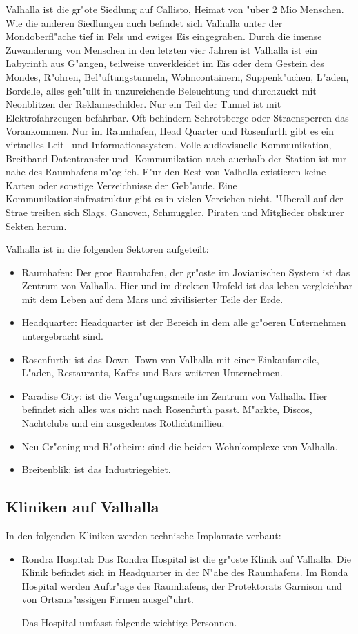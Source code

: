 Valhalla ist die gr"o\3te Siedlung auf Callisto, Heimat von "uber 2 Mio Menschen. Wie die anderen Siedlungen auch befindet sich Valhalla unter der Mondoberfl"ache tief in Fels und ewiges Eis eingegraben. Durch die imense Zuwanderung von Menschen in den letzten vier Jahren ist Valhalla ist ein Labyrinth aus G"angen, teilweise unverkleidet im Eis oder dem Gestein des Mondes, R"ohren, Bel"uftungstunneln, Wohncontainern, Suppenk"uchen, L"aden, Bordelle, alles geh"ullt in unzureichende Beleuchtung und durchzuckt mit Neonblitzen der Reklameschilder. Nur ein Teil der Tunnel ist mit Elektrofahrzeugen befahrbar. Oft behindern Schrottberge oder Stra\3ensperren das Vorankommen. Nur im Raumhafen, Head Quarter und Rosenfurth gibt es ein virtuelles Leit-- und Informationssystem. Volle audiovisuelle Kommunikation, Breitband-Datentransfer und -Kommunikation nach au\3erhalb der Station ist nur nahe des Raumhafens m"oglich. F"ur den Rest von Valhalla existieren keine Karten oder sonstige Verzeichnisse der Geb"aude. Eine Kommunikationsinfrastruktur gibt es in vielen Vereichen nicht. "Uberall auf der Stra\3e treiben sich Slags, Ganoven, Schmuggler, Piraten  und Mitglieder obskurer Sekten herum.

Valhalla ist in die folgenden Sektoren aufgeteilt:

\begin{itemize}
    \item Raumhafen: Der gro\3e Raumhafen, der gr"oste im Jovianischen System ist das Zentrum von Valhalla. Hier und im direkten Umfeld ist das leben vergleichbar mit dem Leben auf dem Mars und zivilisierter Teile der Erde.
    \item Headquarter: Headquarter ist der Bereich in dem alle gr"o\3eren Unternehmen untergebracht sind.
    \item Rosenfurth: ist das Down--Town  von Valhalla mit einer Einkaufsmeile, L"aden, Restaurants, Kaffes und Bars weiteren Unternehmen.
    \item Paradise City: ist die Vergn"ugungsmeile im Zentrum von Valhalla. Hier befindet sich alles was nicht nach Rosenfurth passt. M"arkte, Discos, Nachtclubs und ein ausgedentes Rotlichtmillieu.
    \item Neu Gr"oning und R"otheim: sind die beiden Wohnkomplexe von Valhalla.
    \item Breitenblik: ist das Industriegebiet.
\end{itemize}

\subsection{Kliniken auf Valhalla}

In den folgenden Kliniken werden technische Implantate verbaut:

\begin{itemize}
    \item Rondra Hospital: Das Rondra Hospital ist die gr"os\3te Klinik auf Valhalla. Die Klinik befindet sich in Headquarter in der N"ahe des Raumhafens. Im Ronda Hospital werden Auftr"age des Raumhafens, der Protektorats Garnison und von Ortsans"assigen Firmen ausgef"uhrt.
    
    Das Hospital umfasst folgende wichtige Personnen.
\end{itemize}
